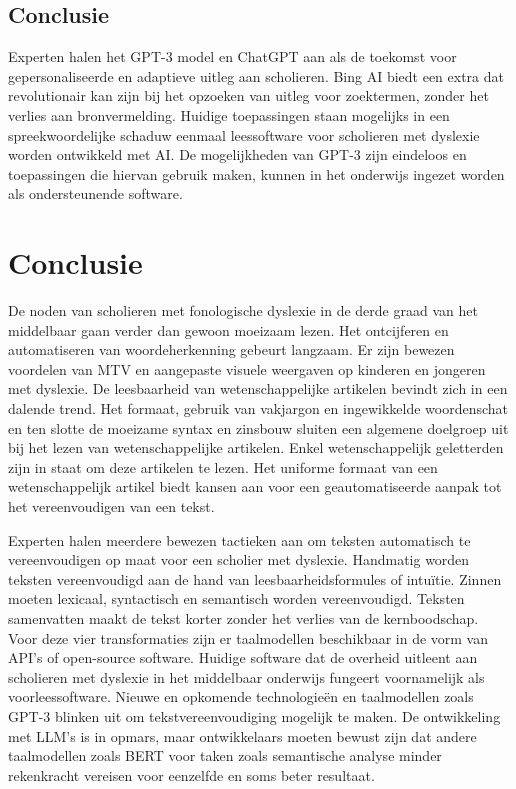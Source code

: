 \subsection{Conclusie}

Experten halen het GPT-3 model en ChatGPT aan als de toekomst voor gepersonaliseerde en adaptieve uitleg aan scholieren. Bing AI biedt een extra dat revolutionair kan zijn bij het opzoeken van uitleg voor zoektermen, zonder het verlies aan bronvermelding. Huidige toepassingen staan mogelijks in een spreekwoordelijke schaduw eenmaal leessoftware voor scholieren met dyslexie worden ontwikkeld met AI. De mogelijkheden van GPT-3 zijn eindeloos en toepassingen die hiervan gebruik maken, kunnen in het onderwijs ingezet worden als ondersteunende software.


\section{Conclusie}

De noden van scholieren met fonologische dyslexie in de derde graad van het middelbaar gaan verder dan gewoon moeizaam lezen.  Het ontcijferen en automatiseren van woordeherkenning gebeurt langzaam. Er zijn bewezen voordelen van MTV en aangepaste visuele weergaven op kinderen en jongeren met dyslexie. De leesbaarheid van wetenschappelijke artikelen bevindt zich in een dalende trend. Het formaat, gebruik van vakjargon en ingewikkelde woordenschat en ten slotte de moeizame syntax en zinsbouw sluiten een algemene doelgroep uit bij het lezen van wetenschappelijke artikelen. Enkel wetenschappelijk geletterden zijn in staat om deze artikelen te lezen. Het uniforme formaat van een wetenschappelijk artikel biedt kansen aan voor een geautomatiseerde aanpak tot het vereenvoudigen van een tekst.

\medspace

Experten halen meerdere bewezen tactieken aan om teksten automatisch te vereenvoudigen op maat voor een scholier met dyslexie. Handmatig worden teksten vereenvoudigd aan de hand van leesbaarheidsformules of intuïtie. Zinnen moeten lexicaal, syntactisch en semantisch worden vereenvoudigd. Teksten samenvatten maakt de tekst korter zonder het verlies van de kernboodschap. Voor deze vier transformaties zijn er taalmodellen beschikbaar in de vorm van API's of open-source software. Huidige software dat de overheid uitleent aan scholieren met dyslexie in het middelbaar onderwijs fungeert voornamelijk als voorleessoftware. Nieuwe en opkomende technologieën en taalmodellen zoals GPT-3 blinken uit om tekstvereenvoudiging mogelijk te maken. De ontwikkeling met LLM's is in opmars, maar ontwikkelaars moeten bewust zijn dat andere taalmodellen zoals BERT voor taken zoals semantische analyse minder rekenkracht vereisen voor eenzelfde en soms beter resultaat. 